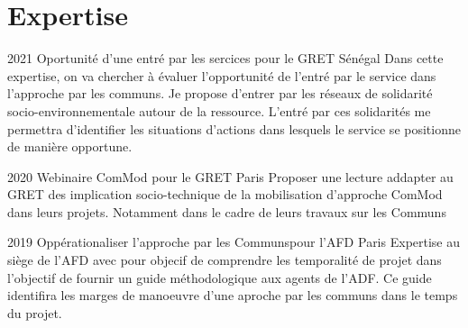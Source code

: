 \documentclass[]{cv-etienne}
\begin{document}
\section{Expertise}
\begin{entrylist}
\entry
{2021}
{Oportunité d'une entré par les sercices {\normalfont pour le GRET}}
{Sénégal}
{Dans cette expertise, on va chercher à évaluer l'opportunité de l'entré par le service dans l'approche par les communs. Je propose d'entrer par les réseaux de solidarité socio-environnementale autour de la ressource. L'entré par ces solidarités me permettra d'identifier les situations d'actions dans lesquels le service se positionne de manière opportune. }
\end{entrylist}
\begin{entrylist}
\entry
{2020}
{Webinaire ComMod {\normalfont pour le GRET}}
{Paris}
{Proposer une lecture addapter au GRET des implication socio-technique de la mobilisation d'approche ComMod dans leurs projets. Notamment dans le cadre de leurs travaux sur les Communs}
\end{entrylist}
\begin{entrylist}
\entry
{2019}
{Oppérationaliser l'approche par les Communs{\normalfont pour l'AFD}}
{Paris}
{Expertise au siège de l'AFD avec pour objecif de comprendre les temporalité de projet dans l'objectif de fournir un guide méthodologique aux agents de l'ADF. Ce guide identifira les marges de manoeuvre d'une aproche par les communs dans le temps du projet.}
\end{entrylist}
\end{document}
